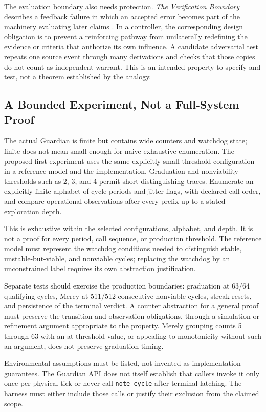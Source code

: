 \documentclass[11pt]{article}
\begin{document}
The evaluation boundary also needs protection. \emph{The Verification Boundary} describes a feedback failure in which an accepted error becomes part of the machinery evaluating later claims \cite{flyxion-verification}. In a controller, the corresponding design obligation is to prevent a reinforcing pathway from unilaterally redefining the evidence or criteria that authorize its own influence. A candidate adversarial test repeats one source event through many derivations and checks that those copies do not count as independent warrant. This is an intended property to specify and test, not a theorem established by the analogy.

\subsection{A Bounded Experiment, Not a Full-System Proof}
\label{sec:experiment}
The actual Guardian is finite but contains wide counters and watchdog state; finite does not mean small enough for naive exhaustive enumeration. The proposed first experiment uses the same explicitly small threshold configuration in a reference model and the implementation. Graduation and nonviability thresholds such as 2, 3, and 4 permit short distinguishing traces. Enumerate an explicitly finite alphabet of cycle periods and jitter flags, with declared call order, and compare operational observations after every prefix up to a stated exploration depth.

This is exhaustive within the selected configurations, alphabet, and depth. It is not a proof for every period, call sequence, or production threshold. The reference model must represent the watchdog conditions needed to distinguish stable, unstable-but-viable, and nonviable cycles; replacing the watchdog by an unconstrained label requires its own abstraction justification.

Separate tests should exercise the production boundaries: graduation at 63/64 qualifying cycles, Mercy at 511/512 consecutive nonviable cycles, streak resets, and persistence of the terminal verdict. A counter abstraction for a general proof must preserve the transition and observation obligations, through a simulation or refinement argument appropriate to the property. Merely grouping counts 5 through 63 with an at-threshold value, or appealing to monotonicity without such an argument, does not preserve graduation timing.

Environmental assumptions must be listed, not invented as implementation guarantees. The Guardian API does not itself establish that callers invoke it only once per physical tick or never call \texttt{note\_cycle} after terminal latching. The harness must either include those calls or justify their exclusion from the claimed scope.
\end{document}
